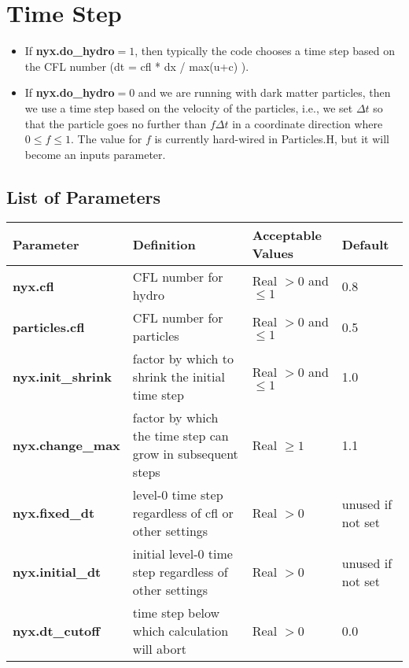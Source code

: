 \section{Time Step}
\begin{itemize}
\item If {\bf nyx.do\_hydro}$ = 1$, then typically 
the code chooses a time step based on the CFL number (dt = cfl * dx / max(u+c) ).

\item If {\bf nyx.do\_hydro}$ = 0$ and we are running with dark matter particles, then we use a time step
based on the velocity of the particles, i.e., we set $\Delta t$ so that the particle goes no further than
$f \Delta t$ in a coordinate direction where $0 \leq f \leq 1.$   The value for $f$ is currently hard-wired
in Particles.H, but it will become an inputs parameter.
\end{itemize}

\subsection{List of Parameters}

\begin{table*}[h]
\begin{scriptsize}
\begin{center}
\begin{tabular}{|l|l|l|l|} \hline
Parameter & Definition & Acceptable Values &Default\\
\hline
{\bf nyx.cfl}    & CFL number for hydro    & Real $> 0$ and $\leq 1$ & 0.8 \\ 
{\bf particles.cfl} & CFL number for particles& Real $> 0$ and $\leq 1$ & 0.5 \\ 
{\bf nyx.init\_shrink} & factor by which to shrink the initial time step & Real $> 0$ and $\leq 1$ & 1.0 \\ 
{\bf nyx.change\_max} & factor by which the time step can grow in subsequent steps & Real $\geq 1$ & 1.1 \\ 
{\bf nyx.fixed\_dt} &  level-0 time step regardless of cfl or other settings & Real $> 0$ & unused if not set \\
{\bf nyx.initial\_dt} &  initial level-0 time step regardless of other settings & Real $> 0$ & unused if not set \\
{\bf nyx.dt\_cutoff} & time step below which calculation will abort & Real $> 0$ & 0.0 \\
\hline
\end{tabular}
\label{Table:TimeStepInputs}
\end{center}
\end{scriptsize}
\end{table*}

